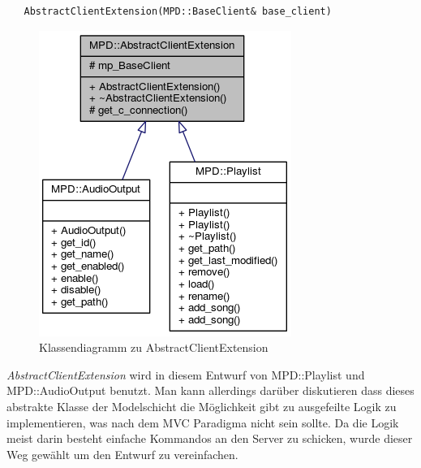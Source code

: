\begin{verbatim}
   AbstractClientExtension(MPD::BaseClient& base_client)
\end{verbatim}

\begin{figure}[htb!]
	\centering
        \includegraphics[scale=0.6]{AbstractClientExtension.png}
	\caption{Klassendiagramm zu AbstractClientExtension}
	\label{c_abstract_client_extension}
\end{figure}

\emph{AbstractClientExtension} wird in diesem Entwurf von MPD::Playlist und MPD::AudioOutput benutzt.
Man kann allerdings darüber diskutieren dass dieses abstrakte Klasse der Modelschicht die Möglichkeit gibt zu ausgefeilte Logik zu implementieren, was nach dem MVC Paradigma nicht sein sollte.  
Da die Logik meist darin besteht einfache Kommandos an den Server zu schicken, wurde dieser Weg gewählt um 
den Entwurf zu vereinfachen.


